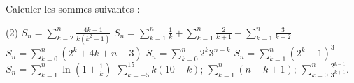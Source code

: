 %
%
Calculer les sommes suivantes :
	\begin{tasks}(2)
		\task $S_n = \sum\limits_{k=2}^n \frac{4k-1}{k(k^2-1)}$
		\task $S_n = \sum\limits_{k=1}^n \frac{1}{k} + \sum\limits_{k=1}^n\frac{2}{k+1} - \sum\limits_{k=1}^n\frac{3}{k+2}$	
		\task $S_n = \sum\limits_{k=0}^n (2^k + 4k +n -3)$
	    \task $S_n = \sum\limits_{k=0}^n 2^k3^{n-k}$
	    \task $S_n = \sum\limits_{k=1}^n (2^k-1)^3$
	     \task $S_n = \sum\limits_{k=1}^n \ln (1 + \frac{1}{k})$
	     \task $\sum_{k=-5}^{15} k(10-k)$;
	     \task $\sum_{k=1}^n (n-k+1)$;
	     \task $\sum_{k=0}^n \frac{2^{k-1}}{3^{k+1}}$.
	\end{tasks}
